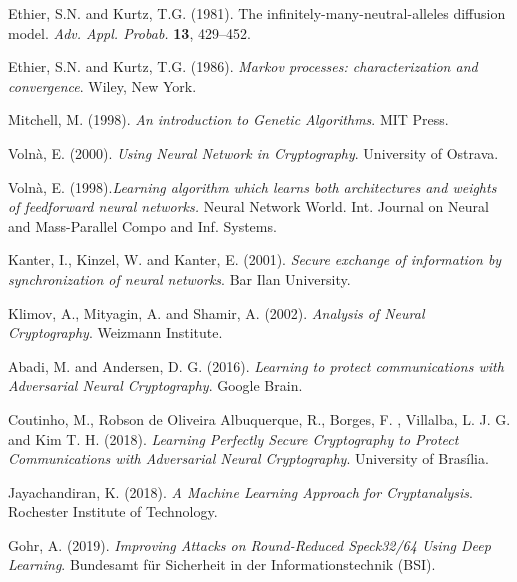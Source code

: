 \documentclass[%
    corpo=11pt,
    twoside,
    stile=classica,
    oldstyle,
    autoretitolo,
    tipotesi=magistrale,
    greek,
    evenboxes,
    english
]{toptesi}
\begin{document}
\begin{thebibliography}{99}

  {\sc Ethier, S.N.} and {\sc Kurtz, T.G.} (1981). The infinitely-many-neutral-alleles diffusion model. {\em Adv. Appl. Probab.} {\bf 13}, 429--452.

  {\sc Ethier, S.N.} and {\sc Kurtz, T.G.} (1986). \emph{Markov processes: characterization and convergence}. Wiley, New York.



 {\sc Mitchell, M.} (1998). \textit{An introduction to Genetic Algorithms}. MIT Press.


 {\sc Volnà, E.} (2000). \textit{Using Neural Network in Cryptography}. University of Ostrava.

 {\sc Volnà, E.} (1998).\textit{Learning algorithm which learns both architectures and weights of feedforward neural networks.} Neural Network World. Int. Journal on Neural and Mass-Parallel Compo and Inf. Systems.

 {\sc Kanter, I.}, {\sc Kinzel, W.} and {\sc Kanter, E.} (2001). \textit{Secure exchange of information by synchronization of neural networks}. Bar Ilan University.

 {\sc Klimov, A.}, {\sc Mityagin, A.} and {\sc Shamir, A.} (2002). \textit{Analysis of Neural Cryptography}. Weizmann Institute.


 {\sc Abadi, M.} and {\sc Andersen, D. G.} (2016). \textit{Learning to protect communications with Adversarial Neural Cryptography}. Google Brain.

 {\sc Coutinho, M.}, {\sc Robson de Oliveira Albuquerque, R.}, {\sc Borges, F. }, {\sc Villalba, L. J. G.} and  {\sc Kim T. H.} (2018). \textit{Learning Perfectly Secure Cryptography to Protect Communications with Adversarial Neural Cryptography}. University of Brasília.

 {\sc Jayachandiran, K.} (2018). \textit{A Machine Learning Approach for Cryptanalysis}. Rochester Institute of Technology.

 {\sc Gohr, A.} (2019). \textit{Improving Attacks on Round-Reduced Speck32/64 Using Deep Learning}. Bundesamt für Sicherheit in der Informationstechnik (BSI).


\end{thebibliography}
\end{document}
